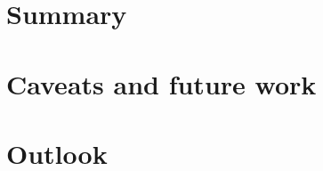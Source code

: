 \section{Summary}
\blindtext

\section{Caveats and future work}
\blindtext

\section{Outlook}
\blindtext